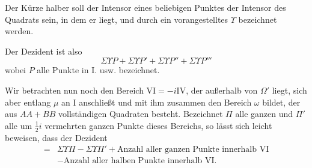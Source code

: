 Der Kürze halber soll der Intensor eines beliebigen Punktes der Intensor des Quadrats sein, in dem er liegt, und durch ein vorangestelltes $\Upsilon$ bezeichnet werden.

Der Dezident ist also
\[
\Sigma\Upsilon P+\Sigma\Upsilon P'+\Sigma\Upsilon P''+\Sigma\Upsilon P'''
\]
wobei $P$ alle Punkte in I. usw. bezeichnet.


Wir betrachten nun noch den Bereich $\mathrm{VI}=-i\mathrm{IV}$, der außerhalb von $\Omega'$ liegt, sich aber entlang $\mu$ an I anschließt und mit ihm zusammen den Bereich $\omega$ bildet, der aus $AA+BB$ vollständigen Quadraten besteht. Bezeichnet $\Pi$ alle ganzen und $\Pi'$ alle um $\frac12i$ vermehrten ganzen Punkte dieses Bereichs, so lässt sich leicht beweisen, dass der Dezident
\[
\begin{aligned}
={}&\Sigma\Upsilon\Pi-\Sigma\Upsilon\Pi'+\text{Anzahl aller ganzen Punkte innerhalb VI}\\
&-\text{Anzahl aller halben Punkte innerhalb VI.}
\end{aligned}
\]
